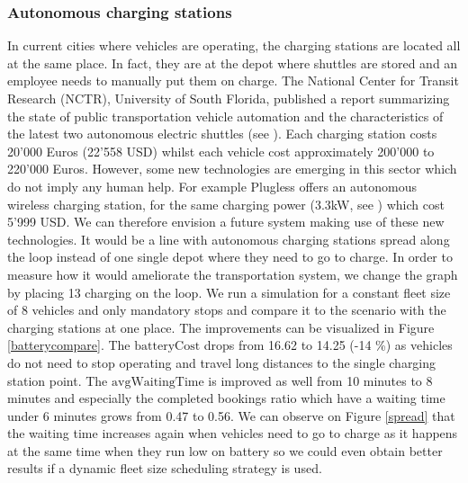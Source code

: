 \documentclass[12pt,a4paper]{article}
\begin{document}
\subsubsection{Autonomous charging stations}\label{spreadcharging}
In current cities where vehicles are operating, the charging stations are located all at the same place. In fact, they are at the depot where shuttles are stored and an employee needs to manually put them on charge. The National Center for Transit Research (NCTR), University of South Florida, published a report summarizing the state of public transportation vehicle automation and the characteristics of the latest two autonomous electric shuttles (see \cite{nctr}). Each charging station costs 20'000 Euros (22'558 USD) whilst each vehicle cost approximately 200'000 to 220'000 Euros. However, some new technologies are emerging in this sector which do not imply any human help. For example Plugless offers an autonomous wireless charging station, for the same charging power (3.3kW, see \cite{plugless}) which cost 5'999 USD. We can therefore envision a future system making use of these new technologies. It would be a line with autonomous charging stations spread along the loop instead of one single depot where they need to go to charge. In order to measure how it would ameliorate the transportation system, we change the graph by placing 13 charging on the loop. We run a simulation for a constant fleet size of 8 vehicles and only mandatory stops and compare it to the scenario with the charging stations at one place. The improvements can be visualized in Figure \ref{batterycompare}. The $\text{batteryCost}$ drops from 16.62 to 14.25 (-14 \%) as vehicles do not need to stop operating and travel long distances to the single charging station point. The $\text{avgWaitingTime}$ is improved as well from 10 minutes to 8 minutes and especially the completed bookings ratio which have a waiting time under 6 minutes grows from 0.47 to 0.56. We can observe on Figure \ref{spread} that the waiting time increases again when vehicles need to go to charge as it happens at the same time when they run low on battery so we could even obtain better results if a dynamic fleet size scheduling strategy is used. 
\end{document}
